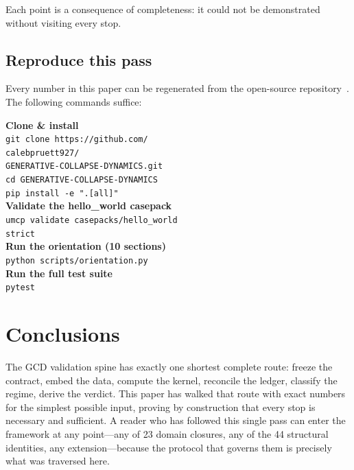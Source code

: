 \documentclass[
  aps,
  prd,
  twocolumn,
  superscriptaddress,
  nofootinbib,
  floatfix
]{revtex4-2}
\begin{document}
Each point is a consequence of completeness: it could not be
demonstrated without visiting every stop.

\subsection{Reproduce this pass}\label{sec:reproduce}

Every number in this paper can be regenerated from the open-source
repository~\cite{umcpmetadatarepo}.  The following commands suffice:

\begin{tcolorbox}[
  colback=black!4,
  colframe=black!60,
  boxrule=1.2pt,
  arc=2pt,
  left=6pt, right=6pt, top=6pt, bottom=6pt,
  title={\bfseries\sffamily Run This Now},
  coltitle=white,
  colbacktitle=black!70,
  fonttitle=\small,
]
\small
\textbf{Clone \& install}\\[2pt]
{\footnotesize\texttt{git clone https://github.com/\\\hspace*{1em}calebpruett927/\\\hspace*{1em}GENERATIVE-COLLAPSE-DYNAMICS.git}}\\[1pt]
\texttt{cd GENERATIVE-COLLAPSE-DYNAMICS}\\[1pt]
\texttt{pip install -e ".[all]"}\\[6pt]
%
\textbf{Validate the hello\_world casepack}\\[2pt]
\texttt{umcp validate casepacks/hello\_world} \\[1pt]
\texttt{\hspace*{2em}{-}{-}strict}\\[6pt]
%
\textbf{Run the orientation (10 sections)}\\[2pt]
\texttt{python scripts/orientation.py}\\[6pt]
%
\textbf{Run the full test suite}\\[2pt]
\texttt{pytest}
\end{tcolorbox}

\section{Conclusions}\label{sec:conclusions}

The GCD validation spine has exactly one shortest complete route:
freeze the contract, embed the data, compute the kernel, reconcile
the ledger, classify the regime, derive the verdict.  This paper
has walked that route with exact numbers for the simplest possible
input, proving by construction that every stop is necessary and
sufficient.  A reader who has followed this single pass can enter
the framework at any point---any of 23 domain closures, any of the
44 structural identities, any extension---because the protocol that
governs them is precisely what was traversed here.
\end{document}
